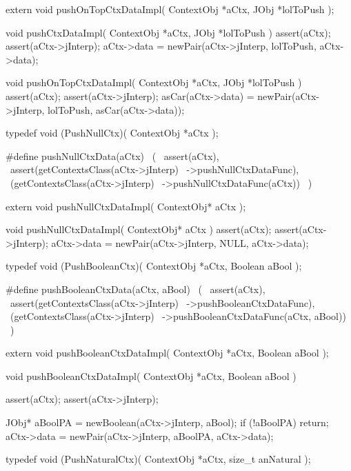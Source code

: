 extern void pushOnTopCtxDataImpl(
  ContextObj *aCtx,
  JObj       *lolToPush
);
\stopCHeader
{}

\startCCode
void pushCtxDataImpl(
  ContextObj *aCtx,
  JObj       *lolToPush
) {
  assert(aCtx);
  assert(aCtx->jInterp);
  aCtx->data = newPair(aCtx->jInterp, lolToPush, aCtx->data);
}

void pushOnTopCtxDataImpl(
  ContextObj *aCtx,
  JObj       *lolToPush
) {
  assert(aCtx);
  assert(aCtx->jInterp);
  asCar(aCtx->data) =
    newPair(aCtx->jInterp, lolToPush, asCar(aCtx->data));
}
\stopCCode

\startCHeader
typedef void (PushNullCtx)(
  ContextObj *aCtx
);

#define pushNullCtxData(aCtx)               \
  (                                         \
    assert(aCtx),                           \
    assert(getContextsClass(aCtx->jInterp)  \
      ->pushNullCtxDataFunc),               \
    (getContextsClass(aCtx->jInterp)        \
      ->pushNullCtxDataFunc(aCtx))          \
  )
\stopCHeader

\setCHeaderStream{private}
\startCHeader
extern void pushNullCtxDataImpl(
  ContextObj* aCtx
);
\stopCHeader
{}

\startCCode
void pushNullCtxDataImpl(
  ContextObj* aCtx
) {
  assert(aCtx);
  assert(aCtx->jInterp);
  aCtx->data = newPair(aCtx->jInterp, NULL, aCtx->data);
}
\stopCCode

\startCHeader
typedef void (PushBooleanCtx)(
  ContextObj *aCtx,
  Boolean     aBool
);

#define pushBooleanCtxData(aCtx, aBool)      \
  (                                          \
    assert(aCtx),                            \
    assert(getContextsClass(aCtx->jInterp)   \
      ->pushBooleanCtxDataFunc),             \
    (getContextsClass(aCtx->jInterp)         \
      ->pushBooleanCtxDataFunc(aCtx, aBool)) \
  )
\stopCHeader

\startCHeader
extern void pushBooleanCtxDataImpl(
  ContextObj *aCtx,
  Boolean     aBool
);
\stopCHeader
\setCHeaderStream{public}

\startCCode
void pushBooleanCtxDataImpl(
  ContextObj *aCtx,
  Boolean     aBool
) {
  assert(aCtx);
  assert(aCtx->jInterp);

  JObj* aBoolPA = newBoolean(aCtx->jInterp, aBool);
  if (!aBoolPA) return;
  aCtx->data = newPair(aCtx->jInterp, aBoolPA, aCtx->data);
}
\stopCCode

\startCHeader
typedef void (PushNaturalCtx)(
  ContextObj *aCtx,
  size_t      anNatural
);

